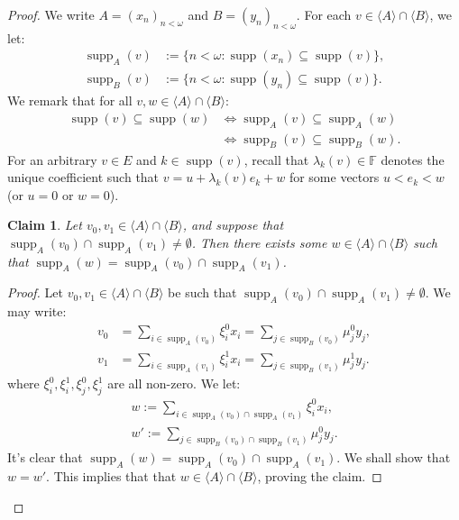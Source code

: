 \documentclass[11pt,reqno]{amsart}
\theoremstyle{plain}
\numberwithin{equation}{section}
\newtheorem{claim}{Claim}
\theoremstyle{definition}
\newcommand{\func}{\operatorname}
\renewcommand{\c}[1]{\langle #1 \rangle}
\newcommand{\supp}{\func{supp}}
\newenvironment{midproof}[1][Proof]
  {\begin{proof}[#1]\renewcommand{\qedsymbol}{$\blacksquare$}}
  {\end{proof}}
\begin{document}
\begin{proof}
    We write $A = (x_n)_{n<\omega}$ and $B = (y_n)_{n<\omega}$. For each $v \in \c{A} \cap \c{B}$, we let:
    \begin{align*}
        \supp_A(v) &:= \{n < \omega : \supp(x_n) \subseteq \supp(v)\}, \\
        \supp_B(v) &:= \{n < \omega : \supp(y_n) \subseteq \supp(v)\}.
    \end{align*}
    We remark that for all $v,w \in \c{A} \cap \c{B}$:
    \begin{align*}
        \supp(v) \subseteq \supp(w) &\iff \supp_A(v) \subseteq \supp_A(w) \\
        &\iff \supp_B(v) \subseteq \supp_B(w).
    \end{align*}
    For an arbitrary $v \in E$ and $k \in \supp(v)$, recall that $\lambda_k(v) \in \mathbb{F}$ denotes the unique coefficient such that $v = u + \lambda_k(v)e_k + w$ for some vectors $u < e_k < w$ (or $u = 0$ or $w = 0$).

    \begin{claim}
    \label{claim:supp(v).intersection}
        Let $v_0,v_1 \in \c{A} \cap \c{B}$, and suppose that $\supp_A(v_0) \cap \supp_A(v_1) \neq \emptyset$. Then there exists some $w \in \c{A} \cap \c{B}$ such that $\supp_A(w) = \supp_A(v_0) \cap \supp_A(v_1)$.
    \end{claim}

    \begin{midproof}
        Let $v_0,v_1 \in \c{A} \cap \c{B}$ be such that $\supp_A(v_0) \cap \supp_A(v_1) \neq \emptyset$. We may write:
        \begin{align}
            v_0 &= \sum_{i \in \supp_A(v_0)} \xi_i^0x_i = \sum_{j \in \supp_B(v_0)} \mu_j^0y_j, \label{eq:v_0} \\
            v_1 &= \sum_{i \in \supp_A(v_1)} \xi_i^1x_i = \sum_{j \in \supp_B(v_1)} \mu_j^1y_j. \label{eq:v_1}
        \end{align}
        where $\xi_i^0,\xi_i^1,\xi_j^0,\xi_j^1$ are all non-zero. We let:
        \begin{align*}
            w := \sum_{i \in \supp_A(v_0) \cap \supp_A(v_1)} \xi_i^0 x_i, \\
            w' := \sum_{j \in \supp_B(v_0) \cap \supp_B(v_1)} \mu_j^0 y_j.
        \end{align*}
        It's clear that $\supp_A(w) = \supp_A(v_0) \cap \supp_A(v_1)$. We shall show that $w = w'$. This implies that that $w \in \c{A} \cap \c{B}$, proving the claim.


\end{midproof}
\end{proof}
\end{document}
